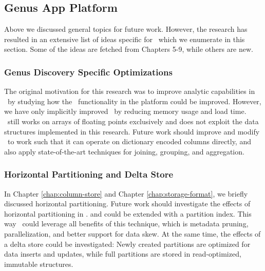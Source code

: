 \subsection{Genus App Platform}
\label{sub:Genus App Platform}
Above we discussed general topics for future work. However, the research has resulted in an extensive list of ideas specific for \gap~which we enumerate in this section. Some of the ideas are fetched from Chapters 5-9, while others are new.

\subsubsection{Genus Discovery Specific Optimizations}
\label{ssub:Genus Discovery Specific Optimizations}
The original motivation for this research was to improve analytic capabilities in \gap~by studying how the \bd~functionality in the platform could be improved. However, we have only implicitly improved \gd~by reducing memory usage and load time. \gd~still works on arrays of floating points exclusively and does not exploit the data structures implemented in this research. Future work should improve and modify \gd~to work such that it can operate on dictionary encoded columns directly, and also apply state-of-the-art techniques for joining, grouping, and aggregation.

\subsubsection{Horizontal Partitioning and Delta Store}
\label{ssub:Horizontal Partitioning and Delta Store}
In Chapter \ref{chap:column-store} and Chapter \ref{chap:storage-format}, we briefly discussed horizontal partitioning. Future work should investigate the effects of horizontal partitioning in \gap.  and  could be extended with a partition index. This way \gap~could leverage all benefits of this technique, which is metadata pruning, parallelization, and better support for data skew. At the same time, the effects of a delta store could be investigated: Newly created partitions are optimized for data inserts and updates, while full partitions are stored in read-optimized, immutable structures.

